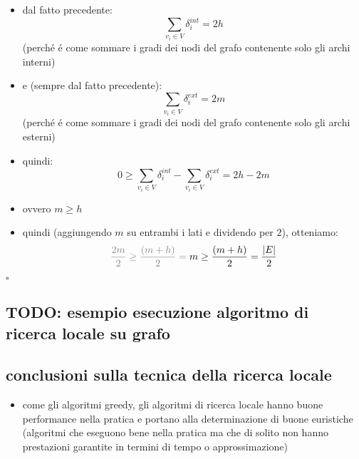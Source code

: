 \begin{flushleft}
\begin{itemize}
		\item dal fatto precedente:
			$$\sum_{v_i\in V}\delta_i^{int}=2h$$
			(perch\'e \'e come sommare i gradi dei nodi del grafo contenente solo gli archi interni)
		\item e (sempre dal fatto precedente):
			$$\sum_{v_i\in V}\delta_i^{ext}=2m$$
			(perch\'e \'e come sommare i gradi dei nodi del grafo contenente solo gli archi esterni)
		\item quindi:
			$$0\geq\sum_{v_i\in V}\delta_i^{int}-\sum_{v_i\in V}\delta_i^{ext}=2h-2m$$
		\item ovvero $m\geq h$
		\item quindi (aggiungendo $m$ su entrambi i lati e dividendo per $2$), otteniamo:
			$$\color{gray}\frac{2m}{2}\geq\frac{(m+h)}{2}=\color{black}m\geq\frac{(m+h)}{2}=\frac{\vert E\vert}{2}$$
	\end{itemize}
	\hfill$\square$
\end{flushleft}


\subsection*{TODO: esempio esecuzione algoritmo di ricerca locale su grafo}
\begin{flushleft}
\end{flushleft}


\subsection*{conclusioni sulla tecnica della ricerca locale}
\begin{flushleft}
	\begin{itemize}
		\item come gli algoritmi greedy, gli algoritmi di ricerca locale hanno buone performance
			nella pratica e portano alla determinazione di buone euristiche (algoritmi che eseguono
			bene nella pratica ma che di solito non hanno prestazioni garantite in termini di tempo
			o approssimazione)
	\end{itemize}
\end{flushleft}


\newpage
